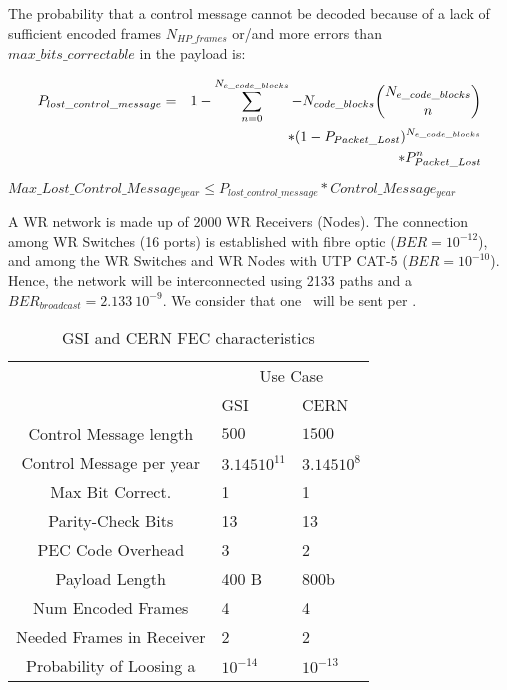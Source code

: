 The probability that a control message cannot be decoded because of a lack of
sufficient encoded frames $N_{HP\_frames}$ or/and more errors than
$max\_bits\_correctable$ in the payload is: 

\begin{eqnarray}
P_{lost\_control\_message} & = & 1- \sum\limits_{n=0}^{N_{e\_code\_blocks}} - 
N_{code\_blocks} \dbinom{N_{e\_code\_blocks}}{n} \\ &&
*  (1 - P_{Packet\_Lost})^{N_{e\_code\_blocks}}\nonumber \\ && 
* P_{Packet\_Lost}^{n} \nonumber
\end{eqnarray}


$ Max\_Lost\_Control\_Message_{year} \leq  P_{lost\_control\_message} *
Control\_Message_{year} $

\vspace{0.3cm}

A WR network is made up of 2000 WR Receivers (Nodes). The connection among WR
Switches (16 ports) is established with fibre optic ($BER = 10^{-12}$),
and among the WR Switches and WR Nodes with UTP CAT-5 ($BER= 10^{-10}$). Hence,
the network will be interconnected using 2133 paths and a $BER_{broadcast} =
2.133 \ 10^{-9}$. We consider that one \ControlMessage\ will be sent per \GW. 

\begin{table}[!ht]
 	\begin{center}
\begin{tabular}{c|m{3cm}|m{3cm}|}
	\cline{2-3}
	&  \multicolumn{2}{|c|}{Use Case} \\ \cline{2-3}
	&  GSI & CERN \\ \hline
	\multicolumn{1}{|c|}{Control Message length} & $500$ & $1500$     \\ \hline
	\multicolumn{1}{|c|}{Control Message per year} & $3.145 10^{11} $ &$  3.145 10^{8} $ \\ \hline
	\multicolumn{1}{|c|}{Max Bit Correct.} & 1 & 1  \\ \hline
	\multicolumn{1}{|c|}{Parity-Check Bits} & 13    &  13   \\ \hline
	\multicolumn{1}{|c|}{PEC Code Overhead} & 3  & 2 \\ \hline
	\multicolumn{1}{|c|}{Payload Length} & 400 B  & 800b \\ \hline
	\multicolumn{1}{|c|}{Num Encoded Frames} & 4  & 4 \\ \hline
	\multicolumn{1}{|c|}{Needed Frames in Receiver} & 2 & 2 \\ \hline
	\multicolumn{1}{|c|}{Probability of Loosing a \ControlMessage} & $10^{-14}$ & $10^{-13}$\\ \hline
	\end{tabular}   
	\caption{GSI and CERN FEC characteristics}
	\label{tab:gsi_cern_fec}
	\end{center}
\end{table}

